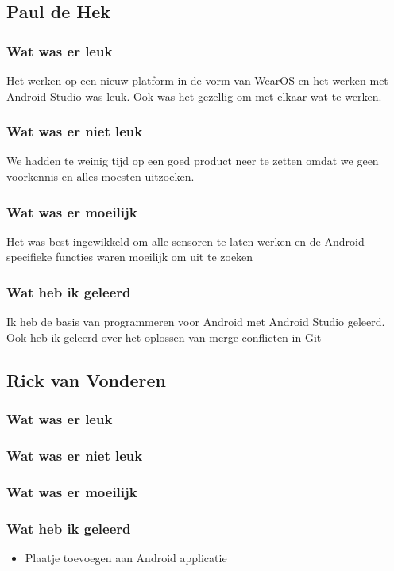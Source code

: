 \documentclass[../main.tex]{subfiles}
\begin{document}
\subsection{Paul de Hek}
\subsubsection{Wat was er leuk}
Het werken op een nieuw platform in de vorm van WearOS en het werken met Android Studio was leuk. Ook
was het gezellig om met elkaar wat te werken.
\subsubsection{Wat was er niet leuk}
We hadden te weinig tijd op een goed product neer te zetten omdat we geen voorkennis en alles moesten
uitzoeken.
\subsubsection{Wat was er moeilijk}
Het was best ingewikkeld om alle sensoren te laten werken en de Android specifieke functies waren
moeilijk om uit te zoeken
\subsubsection{Wat heb ik geleerd}
Ik heb de basis van programmeren voor Android met Android Studio geleerd. Ook heb ik geleerd over
het oplossen van merge conflicten in Git
\newpage

\subsection{Rick van Vonderen}
\subsubsection{Wat was er leuk}
\subsubsection{Wat was er niet leuk}
\subsubsection{Wat was er moeilijk}
\subsubsection{Wat heb ik geleerd}
\begin{itemize}
	\item Plaatje toevoegen aan Android applicatie
\end{itemize}
\newpage
\end{document}
